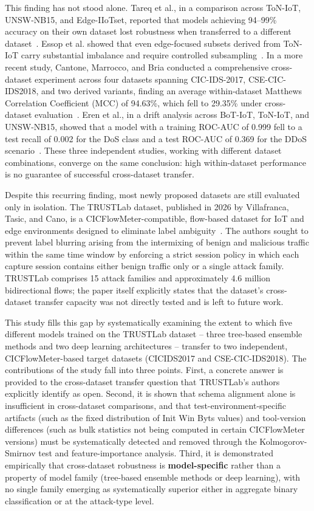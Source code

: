 \documentclass[a4paper,fleqn]{cas-sc}
\begin{document}
This finding has not stood alone. Tareq et al., in a comparison across ToN-IoT, UNSW-NB15, and Edge-IIoTset, reported that models achieving 94--99\% accuracy on their own dataset lost robustness when transferred to a different dataset~\cite{Tareq2022}. Essop et al. showed that even edge-focused subsets derived from ToN-IoT carry substantial imbalance and require controlled subsampling~\cite{Essop2021}. In a more recent study, Cantone, Marrocco, and Bria conducted a comprehensive cross-dataset experiment across four datasets spanning CIC-IDS-2017, CSE-CIC-IDS2018, and two derived variants, finding an average within-dataset Matthews Correlation Coefficient (MCC) of 94.63\%, which fell to 29.35\% under cross-dataset evaluation~\cite{Cantone2024}. Eren et al., in a drift analysis across BoT-IoT, ToN-IoT, and UNSW-NB15, showed that a model with a training ROC-AUC of 0.999 fell to a test recall of 0.002 for the DoS class and a test ROC-AUC of 0.369 for the DDoS scenario~\cite{Eren2026}. These three independent studies, working with different dataset combinations, converge on the same conclusion: high within-dataset performance is no guarantee of successful cross-dataset transfer.

Despite this recurring finding, most newly proposed datasets are still evaluated only in isolation. The TRUSTLab dataset, published in 2026 by Villafranca, Tasic, and Cano, is a CICFlowMeter-compatible, flow-based dataset for IoT and edge environments designed to eliminate label ambiguity~\cite{Villafranca2026}. The authors sought to prevent label blurring arising from the intermixing of benign and malicious traffic within the same time window by enforcing a strict session policy in which each capture session contains either benign traffic only or a single attack family. TRUSTLab comprises 15 attack families and approximately 4.6 million bidirectional flows; the paper itself explicitly states that the dataset's cross-dataset transfer capacity was not directly tested and is left to future work.

This study fills this gap by systematically examining the extent to which five different models trained on the TRUSTLab dataset -- three tree-based ensemble methods and two deep learning architectures -- transfer to two independent, CICFlowMeter-based target datasets (CICIDS2017 and CSE-CIC-IDS2018). The contributions of the study fall into three points. First, a concrete answer is provided to the cross-dataset transfer question that TRUSTLab's authors explicitly identify as open. Second, it is shown that schema alignment alone is insufficient in cross-dataset comparisons, and that test-environment-specific artifacts (such as the fixed distribution of Init Win Byts values) and tool-version differences (such as bulk statistics not being computed in certain CICFlowMeter versions) must be systematically detected and removed through the Kolmogorov-Smirnov test and feature-importance analysis. Third, it is demonstrated empirically that cross-dataset robustness is \textbf{model-specific} rather than a property of model family (tree-based ensemble methods or deep learning), with no single family emerging as systematically superior either in aggregate binary classification or at the attack-type level.
\end{document}
